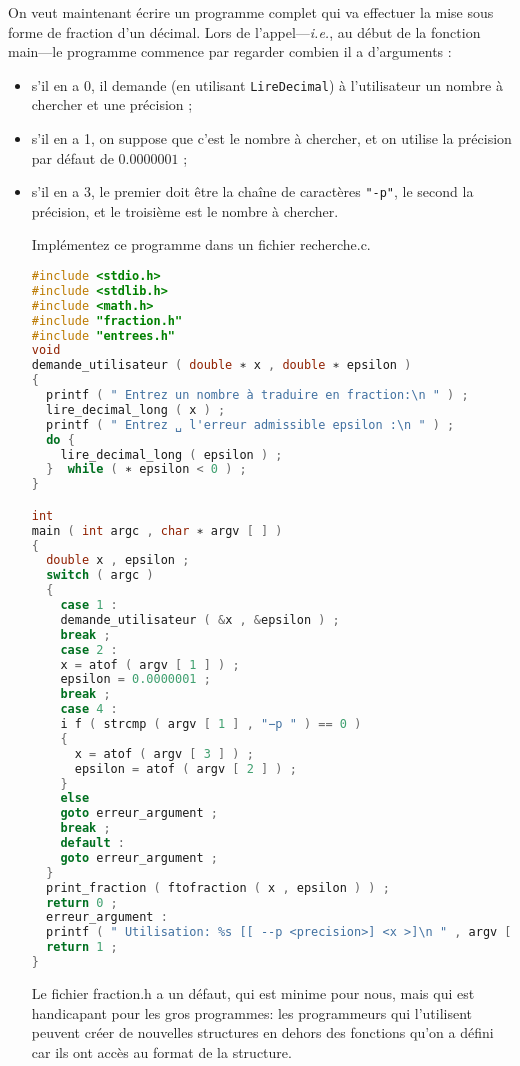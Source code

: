 On veut maintenant écrire un programme complet qui va effectuer la
mise sous forme de fraction d’un décimal. Lors de
l’appel---\textit{i.e.}, au début de la fonction main---le programme
commence par regarder combien il a d’arguments :
\begin{itemize}
\item s’il en a 0, il demande (en utilisant \texttt{LireDecimal}) à
  l’utilisateur un nombre à chercher et une précision ;
\item s’il en a 1, on suppose que c’est le nombre à chercher, et on
  utilise la précision par défaut de \(0.0000001\) ;
\item s’il en a 3, le premier doit être la chaîne de caractères
  \texttt{"-p"}, le second la précision, et le troisième est le nombre
  à chercher.


Implémentez ce programme dans un fichier recherche.c.
\begin{solutioncachee}
  \begin{lstlisting}[language=C]
#include <stdio.h>
#include <stdlib.h>
#include <math.h>
#include "fraction.h"
#include "entrees.h"
void
demande_utilisateur ( double ∗ x , double ∗ epsilon )
{
  printf ( " Entrez un nombre à traduire en fraction:\n " ) ;
  lire_decimal_long ( x ) ;
  printf ( " Entrez ␣ l'erreur admissible epsilon :\n " ) ;
  do {
    lire_decimal_long ( epsilon ) ;
  }  while ( ∗ epsilon < 0 ) ;
}

int
main ( int argc , char ∗ argv [ ] )
{
  double x , epsilon ;
  switch ( argc )
  {
    case 1 :
    demande_utilisateur ( &x , &epsilon ) ;
    break ;
    case 2 :
    x = atof ( argv [ 1 ] ) ;
    epsilon = 0.0000001 ;
    break ;
    case 4 :
    i f ( strcmp ( argv [ 1 ] , "−p " ) == 0 )
    {
      x = atof ( argv [ 3 ] ) ;
      epsilon = atof ( argv [ 2 ] ) ;
    }
    else
    goto erreur_argument ;
    break ;
    default :
    goto erreur_argument ;
  }
  print_fraction ( ftofraction ( x , epsilon ) ) ;
  return 0 ;
  erreur_argument :
  printf ( " Utilisation: %s [[ --p <precision>] <x >]\n " , argv [ 0 ] ) ;
  return 1 ;
}

\end{lstlisting}
\end{solutioncachee}


Le fichier fraction.h a un défaut, qui est minime pour nous, mais qui
est handicapant pour les gros programmes: les programmeurs qui
l’utilisent peuvent créer de nouvelles structures en dehors des
fonctions qu’on a défini car ils ont accès au format de la structure.


\end{itemize}
